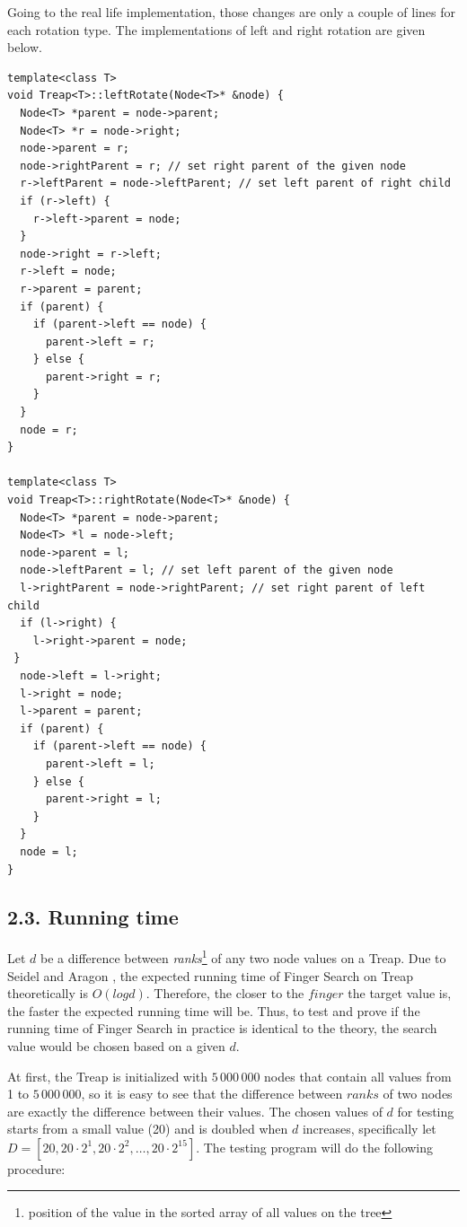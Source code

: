 \documentclass[12pt,english,]{article}
\begin{document}
Going to the real life implementation, those changes are only a couple
of lines for each rotation type. The implementations of left and right
rotation are given below.

\begin{lstlisting}
template<class T>
void Treap<T>::leftRotate(Node<T>* &node) {
  Node<T> *parent = node->parent;
  Node<T> *r = node->right;
  node->parent = r;
  node->rightParent = r; // set right parent of the given node
  r->leftParent = node->leftParent; // set left parent of right child 
  if (r->left) {
    r->left->parent = node;
  }
  node->right = r->left;
  r->left = node;
  r->parent = parent;
  if (parent) {
    if (parent->left == node) {
      parent->left = r;
    } else {
      parent->right = r;
    }
  }
  node = r;
}

template<class T>
void Treap<T>::rightRotate(Node<T>* &node) {
  Node<T> *parent = node->parent;
  Node<T> *l = node->left;
  node->parent = l;
  node->leftParent = l; // set left parent of the given node
  l->rightParent = node->rightParent; // set right parent of left child 
  if (l->right) {
    l->right->parent = node;
 }
  node->left = l->right;
  l->right = node;
  l->parent = parent;
  if (parent) {
    if (parent->left == node) {
      parent->left = l;
    } else {
      parent->right = l;
    }
  }
  node = l;
}
\end{lstlisting}

\hypertarget{running-time}{%
\subsection{2.3. Running time}\label{running-time}}

Let \(d\) be a difference between \emph{ranks}\footnote{position of the
  value in the sorted array of all values on the tree} of any two node
values on a Treap. Due to Seidel and Aragon \cite{1}, the expected
running time of Finger Search on Treap theoretically is \(O(logd)\).
Therefore, the closer to the \(finger\) the target value is, the faster
the expected running time will be. Thus, to test and prove if the
running time of Finger Search in practice is identical to the theory,
the search value would be chosen based on a given \(d\).

At first, the Treap is initialized with \(5\,000\,000\) nodes that
contain all values from 1 to \(5\,000\,000\), so it is easy to see that
the difference between \(ranks\) of two nodes are exactly the difference
between their values. The chosen values of \(d\) for testing starts from
a small value (20) and is doubled when \(d\) increases, specifically let
\(D = [20, 20\cdot2^1, 20\cdot2^2, \ldots, 20\cdot2^{15}]\). The testing
program will do the following procedure: \vspace{-4mm}
\end{document}
